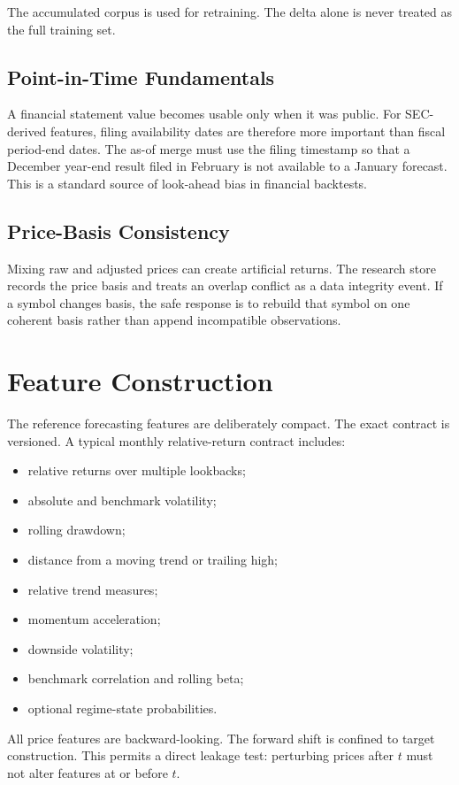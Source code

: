 \documentclass[11pt]{article}
\begin{document}
The accumulated corpus is used for retraining. The delta alone is never treated as the full training set.

\subsection{Point-in-Time Fundamentals}
A financial statement value becomes usable only when it was public. For SEC-derived features, filing availability dates are therefore more important than fiscal period-end dates. The as-of merge must use the filing timestamp so that a December year-end result filed in February is not available to a January forecast. This is a standard source of look-ahead bias in financial backtests.

\subsection{Price-Basis Consistency}
Mixing raw and adjusted prices can create artificial returns. The research store records the price basis and treats an overlap conflict as a data integrity event. If a symbol changes basis, the safe response is to rebuild that symbol on one coherent basis rather than append incompatible observations.

\section{Feature Construction}
The reference forecasting features are deliberately compact. The exact contract is versioned. A typical monthly relative-return contract includes:
\begin{itemize}[itemsep=0.15em]
\item relative returns over multiple lookbacks;
\item absolute and benchmark volatility;
\item rolling drawdown;
\item distance from a moving trend or trailing high;
\item relative trend measures;
\item momentum acceleration;
\item downside volatility;
\item benchmark correlation and rolling beta;
\item optional regime-state probabilities.
\end{itemize}

All price features are backward-looking. The forward shift is confined to target construction. This permits a direct leakage test: perturbing prices after $t$ must not alter features at or before $t$.
\end{document}
